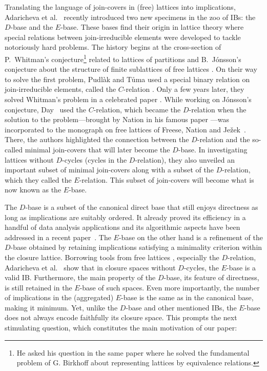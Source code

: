 \documentclass[12pt, a4paper]{article}
\begin{document}
Translating the language of join-covers in (free) lattices \cite{freese1995free} into implications, Adaricheva et al.~\cite{adaricheva2013ordered} recently introduced two new specimens in the zoo of IBs: the $D$-base and the $E$-base.
These bases find their origin in lattice theory where special relations between join-irreducible elements were developed to tackle notoriously hard problems.
The history begins at the cross-section of P.~Whitman's conjecture\footnote{He asked his question in the same paper where he solved the fundamental problem of G. Birkhoff \cite{birkhoff1935structure} about representing lattices by equivalence relations.} related to lattices of partitions \cite{whitman1946lattices} and B.~J\'onsson's conjecture about the structure of finite sublattices of free lattices \cite{jonsson1962finite}.
On their way to solve the first problem, Pudl\`ak and T\r{u}ma used a special binary relation on join-irreducible elements, called the $C$-relation \cite{pudlak1974yeast}.
Only a few years later, they solved Whitman's problem in a celebrated paper \cite{pudlak1980every}.
While working on J\'onsson's conjecture, Day~\cite{day1979characterizations} used the $C$-relation, which became the $D$-relation when the solution to the problem---brought by Nation in his famous paper \cite{nation1982finite}---was incorporated to the monograph on free lattices of Freese, Nation and Je\v{z}ek~\cite{freese1995free}.
There, the authors highlighted the connection between the $D$-relation and the so-called minimal join-covers that will later become the $D$-base.
In investigating lattices without $D$-cycles (cycles in the $D$-relation), they also unveiled an important subset of minimal join-covers along with a subset of the $D$-relation, which they called the $E$-relation. 
This subset of join-covers will become what is now known as the $E$-base.

The $D$-base is a subset of the canonical direct base that still enjoys directness as long as implications are suitably ordered.
It already proved its efficiency in a handful of data analysis applications \cite{adaricheva2015measuring,adaricheva2017discovery,adaricheva2023importance,nation2021combining} and its algorithmic aspects have been addressed in a recent paper~\cite{adaricheva2024computing}.
The $E$-base on the other hand is a refinement of the $D$-base obtained by retaining implications satisfying a minimality criterion within the closure lattice.
Borrowing tools from free lattices \cite{freese1995free}, especially the $D$-relation, Adaricheva et al.~\cite{adaricheva2013ordered} show that in closure spaces without $D$-cycles, the $E$-base is a valid IB. 
Furthermore, the main property of the $D$-base, its feature of directness, is still retained in the $E$-base of such spaces. 
Even more importantly, the number of implications in the (aggregated) $E$-base is the same as in the canonical base, making it minimum.
Yet, unlike the $D$-base and other mentioned IBs, the $E$-base does not always encode faithfully its closure space.
This prompts the next stimulating question, which constitutes the main motivation of our paper:
\end{document}
